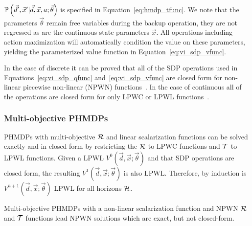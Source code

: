 {\footnotesize $\mathbb{P}\left({\vec{d}', \vec{x}' | \vec{d}, \vec{x}, a; \vec{\theta}}\right)$ } is specified in Equation~\eqref{eq:hmdp_tfunc}. We note that the parameters {\footnotesize $\vec{\theta}$} remain free variables during the backup operation, they are not regressed as are the continuous state parameters {\footnotesize $ \vec{x} $}. All operations including action maximization will automatically condition the value on these parameters, yielding the parameterized value function in Equation~\eqref{eq:vi_sdp_vfunc}.

In the case of discrete {\footnotesize \Action} it can be proved that all of the SDP operations used in Equations~\eqref{eq:vi_sdp_qfunc} and~\eqref{eq:vi_sdp_vfunc} are closed form for non-linear piecewise non-linear (NPWN) functions~\parencite{Sanner_UAI_2011}. In the case of continuous {\footnotesize \Action} all of the operations are closed form for only LPWC or LPWL functions~\parencite{Zamani_AAAI_2012}.


\subsubsection{Multi-objective PHMDPs}

PHMDPs with multi-objective {\footnotesize $\mathcal{R}$} and linear scalarization functions can be solved exactly and in closed-form by restricting the {\footnotesize $\mathcal{R}$} to LPWC functions and {\footnotesize $\mathcal{T}$} to LPWL functions. Given a LPWL {\footnotesize $V^{0}(\vec{d}, \vec{x}; \vec{\theta})$} and that SDP operations are closed form, the resulting {\footnotesize $V^{1}(\vec{d}, \vec{x}; \vec{\theta})$} is also LPWL. Therefore, by induction is {\footnotesize $V^{h+1}(\vec{d}, \vec{x}; \vec{\theta})$} LPWL for all horizons {\footnotesize $ \mathcal{H} $}.

Multi-objective PHMDPs with a non-linear scalarization function and NPWN {\footnotesize $\mathcal{R}$} and {\footnotesize $\mathcal{T}$} functions lead NPWN solutions which are exact, but not closed-form\parencite{Sanner_UAI_2011}.


